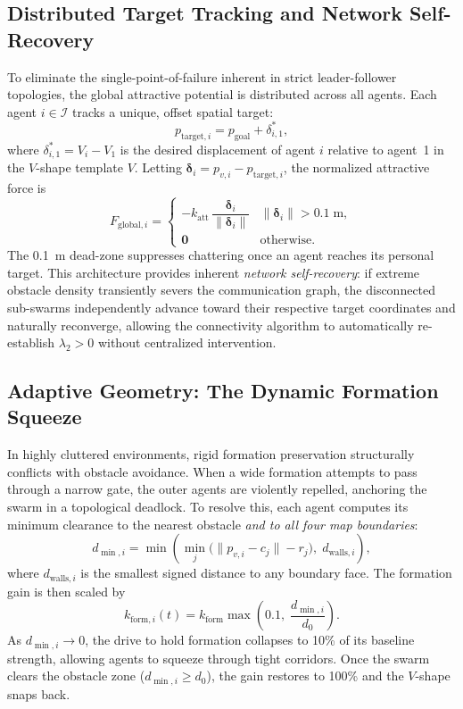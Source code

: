 \documentclass[letterpaper, 10 pt, journal, twoside]{IEEEtran}
\def\scr#1{{\mathcal #1}}
\begin{document}
\subsection{Distributed Target Tracking and Network Self-Recovery}
To eliminate the single-point-of-failure inherent in strict leader-follower
topologies, the global attractive potential is distributed across all agents.
Each agent $i\in\scr{I}$ tracks a unique, offset spatial target:
\begin{equation}
  p_{\mathrm{target},i}=p_{\mathrm{goal}}+\delta_{i,1}^{*},
  \label{eq:target}
\end{equation}
where $\delta_{i,1}^{*}=V_{i}-V_{1}$ is the desired displacement of
agent $i$ relative to agent~1 in the $V$-shape template $V$.
Letting $\boldsymbol{\delta}_{i}=p_{v,i}-p_{\mathrm{target},i}$, the
normalized attractive force is
\begin{equation}
  F_{\mathrm{global},i}=
  \begin{cases}
    -k_{\mathrm{att}}\,\dfrac{\boldsymbol{\delta}_{i}}{\|\boldsymbol{\delta}_{i}\|}
    & \|\boldsymbol{\delta}_{i}\|>0.1\;\mathrm{m},\\[6pt]
    \mathbf{0}
    & \text{otherwise.}
  \end{cases}
  \label{eq:Fglobal}
\end{equation}
The 0.1~m dead-zone suppresses chattering once an agent reaches its
personal target.  This architecture provides inherent \emph{network
self-recovery}: if extreme obstacle density transiently severs the
communication graph, the disconnected sub-swarms independently advance
toward their respective target coordinates and naturally reconverge,
allowing the connectivity algorithm to automatically re-establish
$\lambda_{2}>0$ without centralized intervention.

\subsection{Adaptive Geometry: The Dynamic Formation Squeeze}
In highly cluttered environments, rigid formation preservation structurally
conflicts with obstacle avoidance.  When a wide formation attempts to pass
through a narrow gate, the outer agents are violently repelled, anchoring
the swarm in a topological deadlock.  To resolve this, each agent computes
its minimum clearance to the nearest obstacle \emph{and to all four map
boundaries}:
\begin{equation}
  d_{\min,i}=\min\!\left(
    \min_{j}\bigl(\|p_{v,i}-c_{j}\|-r_{j}\bigr),\;
    d_{\mathrm{walls},i}
  \right),
  \label{eq:dmin}
\end{equation}
where $d_{\mathrm{walls},i}$ is the smallest signed distance to any
boundary face.  The formation gain is then scaled by
\begin{equation}
  k_{\mathrm{form},i}(t)=k_{\mathrm{form}}
  \max\!\left(0.1,\;\frac{d_{\min,i}}{d_{0}}\right).
  \label{eq:squeeze}
\end{equation}
As $d_{\min,i}\to 0$, the drive to hold formation collapses to 10\% of
its baseline strength, allowing agents to squeeze through tight corridors.
Once the swarm clears the obstacle zone ($d_{\min,i}\geq d_{0}$), the
gain restores to 100\% and the $V$-shape snaps back.
\end{document}
